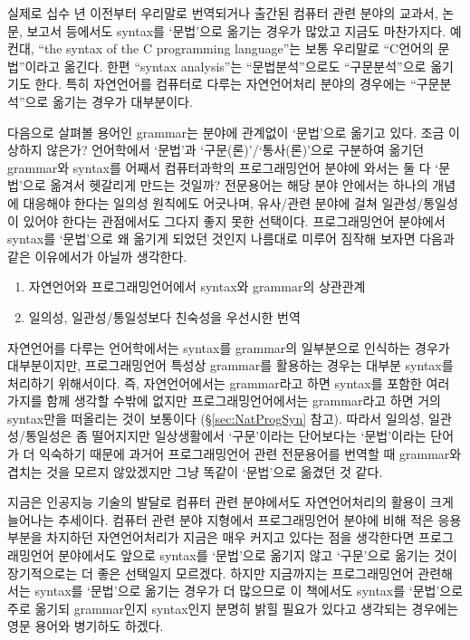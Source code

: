 실제로 십수 년 이전부터 우리말로 번역되거나 출간된 컴퓨터 관련 분야의
교과서, 논문, 보고서 등에서도 syntax를 `문법'으로 옮기는 경우가 많았고
지금도 마찬가지다. 예컨대, ``the syntax of the C programming language''는
보통 우리말로 ``C언어의 문법''이라고 옮긴다. 한편 ``syntax analysis''는
``문법분석''으로도 ``구문분석''으로 옮기기도 한다. 특히 자연언어를 컴퓨터로
다루는 자연언어처리 분야의 경우에는 ``구문분석''으로 옮기는 경우가 대부분이다.

다음으로 살펴볼 용어인 grammar는 분야에 관계없이 `문법'으로 옮기고 있다.
조금 이상하지 않은가? 언어학에서 `문법'과 `구문(론)'/`통사(론)'으로 구분하여
옮기던 grammar와 syntax를 어째서 컴퓨터과학의 프로그래밍언어 분야에 와서는
둘 다 `문법'으로 옮겨서 헷갈리게 만드는 것일까? 전문용어는 해당 분야 안에서는
하나의 개념에 대응해야 한다는 일의성 원칙에도 어긋나며, 유사/관련 분야에 걸쳐
일관성/통일성이 있어야 한다는 관점에서도 그다지 좋지 못한 선택이다.
프로그래밍언어 분야에서 syntax를 `문법'으로 왜 옮기게 되었던 것인지
나름대로 미루어 짐작해 보자면 다음과 같은 이유에서가 아닐까 생각한다.
\begin{enumerate}\tightlist
    \item 자연언어와 프로그래밍언어에서 syntax와 grammar의 상관관계
    \item 일의성, 일관성/통일성보다 친숙성을 우선시한 번역
\end{enumerate}

자연언어를 다루는 언어학에서는 syntax를 grammar의 일부분으로 인식하는 경우가
대부분이지만, 프로그래밍언어 특성상 grammar를 활용하는 경우는 대부분
syntax를 처리하기 위해서이다. 즉, 자연언어에서는 grammar라고 하면 syntax를
포함한 여러 가지를 함께 생각할 수밖에 없지만 프로그래밍언어에서는 grammar라고
하면 거의 syntax만을 떠올리는 것이 보통이다 (\S\ref{sec:NatProgSyn} 참고).
따라서 일의성, 일관성/통일성은 좀 떨어지지만 일상생활에서 `구문'이라는
단어보다는 `문법'이라는 단어가 더 익숙하기 때문에 과거어 프로그래밍언어 관련
전문용어를 번역할 때 grammar와 겹치는 것을 모르지 않았겠지만 그냥 똑같이
`문법'으로 옮겼던 것 같다.

지금은 인공지능 기술의 발달로 컴퓨터 관련 분야에서도 자연언어처리의 활용이
크게 늘어나는 추세이다. 컴퓨터 관련 분야 지형에서 프로그래밍언어 분야에 비해
적은 응용 부분을 차지하던 자연언어처리가 지금은 매우 커지고 있다는 점을
생각한다면 프로그래밍언어 분야에서도 앞으로 syntax를 `문법'으로 옮기지 않고
`구문'으로 옮기는 것이 장기적으로는 더 좋은 선택일지 모르겠다. 하지만
지금까지는 프로그래밍언어 관련해서는 syntax를 `문법'으로 옮기는 경우가 더
많으므로 이 책에서도 syntax를 `문법'으로 주로 옮기되 grammar인지 syntax인지
분명히 밝힐 필요가 있다고 생각되는 경우에는 영문 용어와 병기하도 하겠다.

